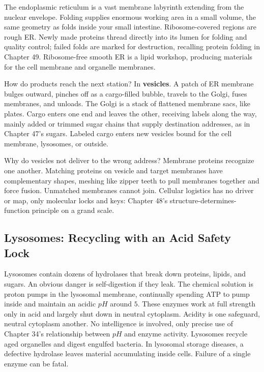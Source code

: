 The endoplasmic reticulum is a vast membrane labyrinth extending from the nuclear envelope. Folding supplies enormous working area in a small volume, the same geometry as folds inside your small intestine. Ribosome-covered regions are rough ER. Newly made proteins thread directly into its lumen for folding and quality control; failed folds are marked for destruction, recalling protein folding in Chapter 49. Ribosome-free smooth ER is a lipid workshop, producing materials for the cell membrane and organelle membranes.

How do products reach the next station? In \textbf{vesicles}. A patch of ER membrane bulges outward, pinches off as a cargo-filled bubble, travels to the Golgi, fuses membranes, and unloads. The Golgi is a stack of flattened membrane sacs, like plates. Cargo enters one end and leaves the other, receiving labels along the way, mainly added or trimmed sugar chains that supply destination addresses, as in Chapter 47's sugars. Labeled cargo enters new vesicles bound for the cell membrane, lysosomes, or outside.

Why do vesicles not deliver to the wrong address? Membrane proteins recognize one another. Matching proteins on vesicle and target membranes have complementary shapes, meshing like zipper teeth to pull membranes together and force fusion. Unmatched membranes cannot join. Cellular logistics has no driver or map, only molecular locks and keys: Chapter 48's structure-determines-function principle on a grand scale.

\subsection{Lysosomes: Recycling with an Acid Safety Lock}

Lysosomes contain dozens of hydrolases that break down proteins, lipids, and sugars. An obvious danger is self-digestion if they leak. The chemical solution is proton pumps in the lysosomal membrane, continually spending ATP to pump  inside and maintain an acidic $pH$ around $5$. These enzymes work at full strength only in acid and largely shut down in neutral cytoplasm. Acidity is one safeguard, neutral cytoplasm another. No intelligence is involved, only precise use of Chapter 34's relationship between $pH$ and enzyme activity. Lysosomes recycle aged organelles and digest engulfed bacteria. In lysosomal storage diseases, a defective hydrolase leaves material accumulating inside cells. Failure of a single enzyme can be fatal.

